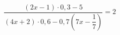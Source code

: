 \begin{ex}[type=equation]
	\begin{condition}
		$\dfrac{(2x - 1)\cdot0,3 - 5}{(4x + 2) \cdot0,6 -0,7\left(7x - \dfrac{1}{7}\right)}=2$
	\end{condition}
\end{ex}
